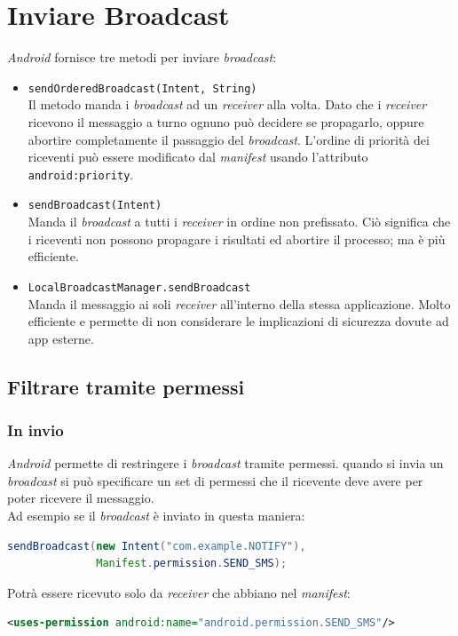 \documentclass{book}
\begin{document}
\section{Inviare Broadcast}
\textit{Android} fornisce tre metodi per inviare \textit{broadcast}:

\begin{itemize}
	\item \texttt{sendOrderedBroadcast(Intent, String)}\\
	Il metodo manda i \textit{broadcast} ad un \textit{receiver} alla volta. Dato che i \textit{receiver} ricevono il messaggio a turno ognuno può decidere se propagarlo, oppure abortire completamente il passaggio del \textit{broadcast}. L'ordine di priorità dei riceventi può essere modificato dal \textit{manifest} usando l'attributo \texttt{android:priority}.
	\item \texttt{sendBroadcast(Intent)}\\
	Manda il \textit{broadcast} a tutti i \textit{receiver} in ordine non prefissato. Ciò significa che i riceventi non possono propagare i risultati ed abortire il processo; ma è più efficiente.
	\item \texttt{LocalBroadcastManager.sendBroadcast}\\
	Manda il messaggio ai soli \textit{receiver} all'interno della stessa applicazione. Molto efficiente e permette di non considerare le implicazioni di sicurezza dovute ad app esterne.
\end{itemize}

\subsection{Filtrare tramite permessi}
\subsubsection{In invio}
\textit{Android} permette di restringere i \textit{broadcast} tramite permessi. quando si invia un \textit{broadcast} si può specificare un set di permessi che il ricevente deve avere per poter ricevere il messaggio.\\
Ad esempio se il \textit{broadcast} è inviato in questa maniera:
\begin{lstlisting}[language=Java]
sendBroadcast(new Intent("com.example.NOTIFY"),
              Manifest.permission.SEND_SMS);
\end{lstlisting}
Potrà essere ricevuto solo da \textit{receiver} che abbiano nel \textit{manifest}:
\begin{lstlisting}[language=XML]
<uses-permission android:name="android.permission.SEND_SMS"/>
\end{lstlisting}
\end{document}
